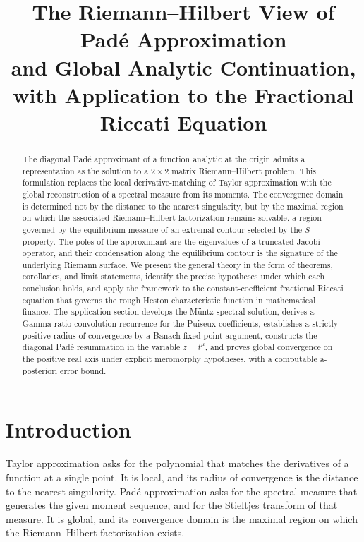 \documentclass[11pt]{article}
\title{The Riemann--Hilbert View of Pad\'e Approximation\\
and Global Analytic Continuation,\\
with Application to the Fractional Riccati Equation}
\author{}
\date{}
\theoremstyle{definition}
\theoremstyle{remark}
\begin{document}
\maketitle

\begin{abstract}
The diagonal Pad\'e approximant of a function analytic at the origin admits a representation as the solution to a $2\times 2$ matrix Riemann--Hilbert problem. This formulation replaces the local derivative-matching of Taylor approximation with the global reconstruction of a spectral measure from its moments. The convergence domain is determined not by the distance to the nearest singularity, but by the maximal region on which the associated Riemann--Hilbert factorization remains solvable, a region governed by the equilibrium measure of an extremal contour selected by the $S$-property. The poles of the approximant are the eigenvalues of a truncated Jacobi operator, and their condensation along the equilibrium contour is the signature of the underlying Riemann surface. We present the general theory in the form of theorems, corollaries, and limit statements, identify the precise hypotheses under which each conclusion holds, and apply the framework to the constant-coefficient fractional Riccati equation that governs the rough Heston characteristic function in mathematical finance. The application section develops the M\"untz spectral solution, derives a Gamma-ratio convolution recurrence for the Puiseux coefficients, establishes a strictly positive radius of convergence by a Banach fixed-point argument, constructs the diagonal Pad\'e resummation in the variable $z = t^{\mu}$, and proves global convergence on the positive real axis under explicit meromorphy hypotheses, with a computable a-posteriori error bound.
\end{abstract}

\tableofcontents

\section{Introduction}
\label{sec:intro}

Taylor approximation asks for the polynomial that matches the derivatives of a function at a single point. It is local, and its radius of convergence is the distance to the nearest singularity. Pad\'e approximation asks for the spectral measure that generates the given moment sequence, and for the Stieltjes transform of that measure. It is global, and its convergence domain is the maximal region on which the Riemann--Hilbert factorization exists.
\end{document}
